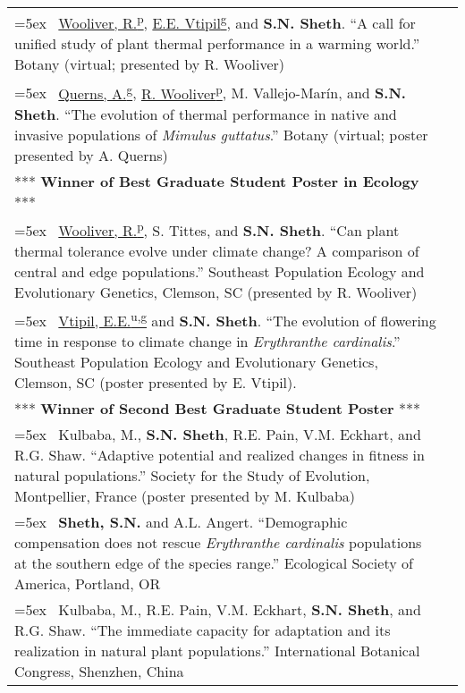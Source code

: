 \documentclass[11pt,english]{article}\usepackage[]{graphicx}\usepackage[]{xcolor}
\providecommand{\tabularnewline}{\\}
\begin{document}
\begin{tabularx}{\textwidth}{@{}>{\raggedright}p{5.25in} >{\raggedleft}X@{}}

\hangindent=5ex \ \underline{Wooliver, R.\textsuperscript{p}}, \underline{E.E. Vtipil\textsuperscript{g}}, and \textbf{S.N. Sheth}. ``A call for unified study of plant thermal performance in a warming world.'' Botany (virtual; presented by R. Wooliver) & 2020 \tabularnewline

\hangindent=5ex \ \underline{Querns, A.\textsuperscript{g}}, \underline{R. Wooliver\textsuperscript{p}}, M. Vallejo-Mar\'in, and \textbf{S.N. Sheth}. ``The evolution of thermal performance in native and invasive populations of \emph{Mimulus guttatus}.'' Botany (virtual; poster presented by A. Querns) & 2020 \tabularnewline
\hspace{7mm} *** \textbf{Winner of Best Graduate Student Poster in Ecology} *** \tabularnewline

\hangindent=5ex \ \underline{Wooliver, R.\textsuperscript{p}}, S. Tittes, and \textbf{S.N. Sheth}. ``Can plant thermal tolerance evolve under climate change? A comparison of central and edge populations.'' Southeast Population Ecology and Evolutionary Genetics, Clemson, SC (presented by R. Wooliver) & 2019 \tabularnewline

\hangindent=5ex \ \underline{Vtipil, E.E.\textsuperscript{u,g}} and \textbf{S.N. Sheth}. ``The evolution of flowering time in response to climate change in \emph{Erythranthe cardinalis}.'' Southeast Population Ecology and Evolutionary Genetics, Clemson, SC (poster presented by E. Vtipil). & 2019 \tabularnewline
\hspace{7mm} *** \textbf{Winner of Second Best Graduate Student Poster} *** \tabularnewline

\hangindent=5ex \ Kulbaba, M., \textbf{S.N. Sheth}, R.E. Pain, V.M. Eckhart, and R.G. Shaw. ``Adaptive potential and realized changes in fitness in natural populations.'' Society for the Study of Evolution, Montpellier, France (poster presented by M. Kulbaba) & 2018 \tabularnewline

\hangindent=5ex \ \textbf{Sheth, S.N.} and A.L. Angert. ``Demographic compensation does not rescue \textit{Erythranthe cardinalis} populations at the southern edge of the species range.'' Ecological Society of America, Portland, OR & 2017 \tabularnewline

\hangindent=5ex \ Kulbaba, M., R.E. Pain, V.M. Eckhart, \textbf{S.N. Sheth}, and R.G. Shaw. ``The immediate capacity for adaptation and its realization in natural plant populations.'' International Botanical Congress, Shenzhen, China & 2017 \tabularnewline


\end{tabularx}
\end{document}
